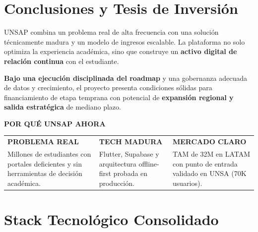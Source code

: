 \documentclass[10.5pt,a4paper]{article}
\begin{document}
\section{Conclusiones y Tesis de Inversión}

UNSAP combina un problema real de alta frecuencia con una solución técnicamente madura y un modelo de ingresos escalable. La plataforma no solo optimiza la experiencia académica, sino que construye un \textbf{activo digital de relación continua} con el estudiante.

\begin{keybox}
\textbf{Bajo una ejecución disciplinada del roadmap} y una gobernanza adecuada de datos y crecimiento, el proyecto presenta condiciones sólidas para financiamiento de etapa temprana con potencial de \textbf{expansión regional y salida estratégica} de mediano plazo.
\end{keybox}

\vspace{0.5cm}

\begin{darkbox}
\begin{center}
  {\color{unsaGold}\bfseries POR QUÉ UNSAP AHORA}\\[0.6cm]
  \begin{tabular}{@{} p{4.5cm} p{4.5cm} p{4.5cm} @{}}
    {\color{unsaGold}\small\bfseries PROBLEMA REAL} &
    {\color{unsaGold}\small\bfseries TECH MADURA} &
    {\color{unsaGold}\small\bfseries MERCADO CLARO} \\[4pt]
    {\scriptsize\color{white!80!coverBg}
      Millones de estudiantes con portales deficientes y sin herramientas de decisión académica.} &
    {\scriptsize\color{white!80!coverBg}
      Flutter, Supabase y arquitectura offline-first probada en producción.} &
    {\scriptsize\color{white!80!coverBg}
      TAM de 32M en LATAM con punto de entrada validado en UNSA (70K usuarios).}
  \end{tabular}
\end{center}
\end{darkbox}


\appendix
\section{Stack Tecnológico Consolidado}
\end{document}
